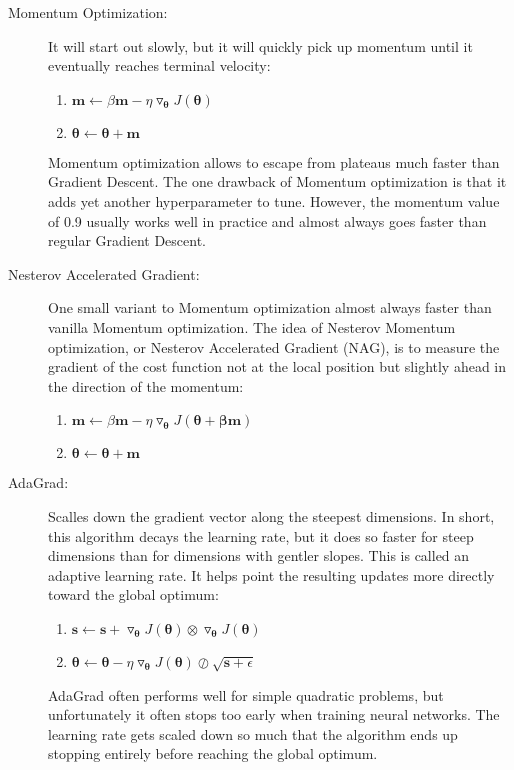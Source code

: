 \documentclass[french]{article}
\begin{document}
\begin{description}
    \item[Momentum Optimization: ] It will start out slowly, but it will quickly pick up momentum until it eventually reaches terminal velocity:
        \begin{enumerate}
            \item $\bm{m} \leftarrow \beta \bm{m} - \eta \triangledown_{\bm{\theta}} J(\bm{\theta})$
            \item $\bm{\theta} \leftarrow \bm{\theta} + \bm{m}$
        \end{enumerate}
Momentum optimization allows to escape from plateaus much faster than Gradient Descent. The one drawback of Momentum optimization is that it adds yet another hyperparameter to tune. However, the momentum value of 0.9 usually works well in practice and almost always goes faster than regular Gradient Descent.
    \item[Nesterov Accelerated Gradient: ] One small variant to Momentum optimization almost always faster than vanilla Momentum optimization. The idea of Nesterov
Momentum optimization, or Nesterov Accelerated Gradient (NAG), is to measure the gradient of the cost function not at the local position but slightly ahead in the direction of the momentum:
        \begin{enumerate}
            \item $\bm{m} \leftarrow \beta \bm{m} - \eta \triangledown_{\bm{\theta}} J(\bm{\theta + \beta \bm{m}})$
            \item $\bm{\theta} \leftarrow \bm{\theta} + \bm{m}$
        \end{enumerate}
    \item[AdaGrad: ] Scalles down the gradient vector along the steepest dimensions. In short, this algorithm decays the learning rate, but it does so faster for steep dimensions than for dimensions with gentler slopes. This is called an adaptive learning rate.  It helps point the resulting updates more directly toward the global optimum:
        \begin{enumerate}
            \item $\bm{s} \leftarrow \bm{s} + \triangledown_{\bm{\theta}} J(\bm{\theta}) \otimes \triangledown_{\bm{\theta}} J(\bm{\theta})$
            \item $\bm{\theta} \leftarrow \bm{\theta} - \eta \triangledown_{\bm{\theta}} J(\bm{\theta}) \oslash \sqrt{\bm{s} + \epsilon}$
        \end{enumerate}
AdaGrad often performs well for simple quadratic problems, but unfortunately it often stops too early when training neural networks. The learning rate gets scaled down so much that the algorithm ends up stopping entirely before reaching the global optimum.

\end{description}
\end{document}
